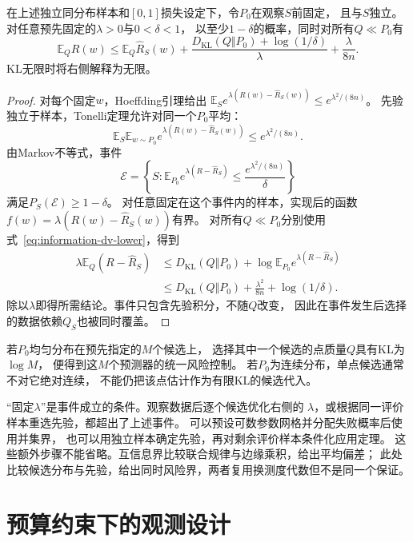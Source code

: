 \begin{theorem}
\label{thm:information-pac-bayes-basic}
在上述独立同分布样本和\([0,1]\)损失设定下，令\(P_0\)在观察\(S\)前固定，
且与\(S\)独立。对任意预先固定的\(\lambda>0\)与\(0<\delta<1\)，
以至少\(1-\delta\)的概率，同时对所有\(Q\ll P_0\)有
\begin{equation}
  \mathbb E_QR(w)
  \leq\mathbb E_Q\widehat R_S(w)
  +\frac{D_{\mathrm{KL}}(Q\Vert P_0)+\log(1/\delta)}{\lambda}
  +\frac{\lambda}{8n}.
  \label{eq:information-pac-bayes-basic}
\end{equation}
KL无限时将右侧解释为无限。
\end{theorem}
\begin{proof}
对每个固定\(w\)，Hoeffding引理给出
\(\mathbb E_Se^{\lambda(R(w)-\widehat R_S(w))}
\leq e^{\lambda^2/(8n)}\)。
先验独立于样本，Tonelli定理允许对同一个\(P_0\)平均：
\[
  \mathbb E_S\mathbb E_{w\sim P_0}
  e^{\lambda(R(w)-\widehat R_S(w))}
  \leq e^{\lambda^2/(8n)}.
\]
由Markov不等式，事件
\[
  \mathcal E=
  \left\{S:\mathbb E_{P_0}e^{\lambda(R-\widehat R_S)}
  \leq\frac{e^{\lambda^2/(8n)}}{\delta}\right\}
\]
满足\(P_S(\mathcal E)\geq1-\delta\)。
对任意固定在这个事件内的样本，实现后的函数
\(f(w)=\lambda(R(w)-\widehat R_S(w))\)有界。
对所有\(Q\ll P_0\)分别使用式~\eqref{eq:information-dv-lower}，得到
\[
\begin{aligned}
  \lambda\mathbb E_Q(R-\widehat R_S)
  &\leq D_{\mathrm{KL}}(Q\Vert P_0)
       +\log\mathbb E_{P_0}e^{\lambda(R-\widehat R_S)}\\
  &\leq D_{\mathrm{KL}}(Q\Vert P_0)
       +\frac{\lambda^2}{8n}+\log(1/\delta).
\end{aligned}
\]
除以\(\lambda\)即得所需结论。事件只包含先验积分，不随\(Q\)改变，
因此在事件发生后选择的数据依赖\(Q_S\)也被同时覆盖。
\end{proof}

若\(P_0\)均匀分布在预先指定的\(M\)个候选上，
选择其中一个候选的点质量\(Q\)具有KL为\(\log M\)，
便得到这\(M\)个预测器的统一风险控制。
若\(P_0\)为连续分布，单点候选通常不对它绝对连续，
不能仍把该点估计作为有限KL的候选代入。

“固定\(\lambda\)”是事件成立的条件。观察数据后逐个候选优化右侧的
\(\lambda\)，或根据同一评价样本重选先验，都超出了上述事件。
可以预设可数参数网格并分配失败概率后使用并集界，
也可以用独立样本确定先验，再对剩余评价样本条件化应用定理。
这些额外步骤不能省略。互信息界比较联合规律与边缘乘积，给出平均偏差；
此处比较候选分布与先验，给出同时风险界，两者复用换测度代数但不是同一个保证。


\section{预算约束下的观测设计}
\label{sec:statistics-design-information}
